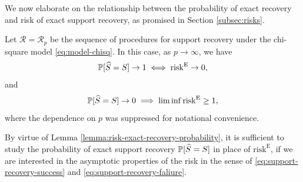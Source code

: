 We now elaborate on the relationship between the probability of exact recovery and risk of exact support recovery, as promised in Section \ref{subsec:risks}.
\begin{lemma} \label{lemma:risk-exact-recovery-probability}
Let $\mathcal{R} = \mathcal{R}_p$ be the sequence of procedures for support recovery under the chi-square model \eqref{eq:model-chisq}. 
In this case, as $p\to\infty$, we have
\begin{equation} \label{eq:exact-recovery-implies-risk-0}
    \P[\widehat{S} = S] \to 1 \iff \mathrm{risk}^{\mathrm{E}}\to0,
\end{equation}
and
\begin{equation} \label{eq:failure-recovery-implies-risk-1}
    \P[\widehat{S} = S] \to 0 \implies \liminf\mathrm{risk}^{\mathrm{E}}\ge1,
\end{equation}
where the dependence on $p$ was suppressed for notational convenience.
\end{lemma}


By virtue of Lemma \ref{lemma:risk-exact-recovery-probability}, it is sufficient to study the probability of exact support recovery $\P[\widehat{S}=S]$ in place of $\mathrm{risk}^{\mathrm{E}}$, if we are interested in the asymptotic properties of the risk in the sense of \eqref{eq:support-recovery-success} and \eqref{eq:support-recovery-faliure}.
